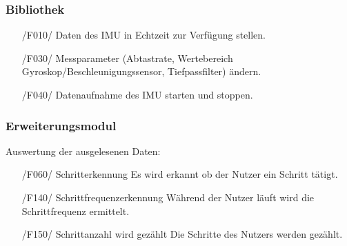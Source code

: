 \documentclass[a4paper,12pt]{article}
\begin{document}
    \subsubsection{Bibliothek}
    \begin{itemize}
      \item[/F010/] Daten des \Gls{IMU} in \Gls{Echtzeit} zur Verfügung stellen.
      \item[/F030/] Messparameter (Abtastrate, Wertebereich Gyroskop/Beschleunigungssensor, Tiefpassfilter) ändern. 
      \item[/F040/] Datenaufnahme des \Gls{IMU} starten und stoppen.
    \end{itemize}
    \subsubsection{Erweiterungsmodul}
     Auswertung der ausgelesenen Daten:
     \begin{itemize}
      \item[/F060/] \textsf{Schritterkennung} Es wird erkannt ob der Nutzer ein Schritt tätigt.
      \item[/F140/] \textsf{Schrittfrequenzerkennung} Während der Nutzer läuft wird die Schrittfrequenz ermittelt.
      \item[/F150/] \textsf{Schrittanzahl wird gezählt} Die Schritte des Nutzers werden gezählt.
    \end{itemize}
\end{document}

